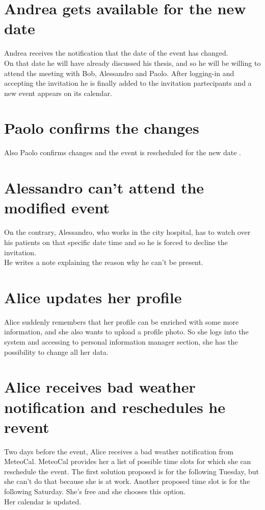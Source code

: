 \documentclass[12pt]{book}
\begin{document}
\section {Andrea gets available for the new date}
Andrea receives the notification that the date of the event has changed. \\
On that date he will have already discussed his thesis, and so he will be willing to attend the meeting with Bob, Alessandro and Paolo. After logging-in and accepting the invitation he is finally added to the invitation partecipants and a new event appears on its calendar. \\

\section{Paolo confirms the changes }
Also Paolo confirms changes and the event is rescheduled for the new date .

\section{Alessandro can't attend the modified event} 
On the contrary, Alessandro, who works in the city hospital, has to watch over his patients on that specific date time and so he is forced to decline the invitation. \\ He writes a note explaining the reason why he can't be present. 

\section{Alice updates her profile}
Alice suddenly remembers that her profile can be enriched with some more information, and she also wants to 
upload a profile photo. So she logs into the system and accessing to personal information manager section, she has the possibility to change all her data. 

\section{Alice receives bad weather notification and reschedules he revent}
Two days before the event, Alice receives a bad weather notification from MeteoCal. MeteoCal provides her a list of possible time slots for which she can reschedule the event. The first solution proposed is for the following Tuesday, but she can't do that because she is at work. Another proposed time slot is for the following Saturday. She's free and she chooses this option. \\
Her calendar is updated. 
\end{document}

